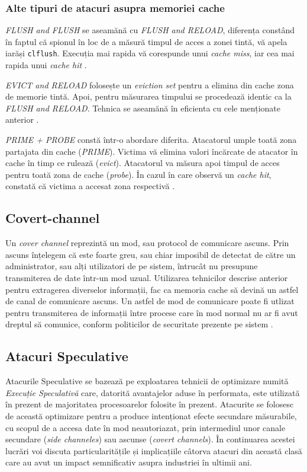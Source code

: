 \subsubsection{Alte tipuri de atacuri asupra memoriei cache}

\emph{FLUSH and FLUSH} se aseamănă cu \emph{FLUSH and RELOAD}, diferența 
constând în faptul că spionul în loc de a măsură timpul de acces a zonei
tintă, vă apela iarăși \texttt{clflush}. Execuția mai rapida vă corespunde
unui \emph{cache miss}, iar cea mai rapida unui \emph{cache hit} \cite{cache_attacks}.

\emph{EVICT and RELOAD} folosește un \emph{eviction set} pentru a elimina din
cache zona de memorie tintă. Apoi, pentru măsurarea timpului se procedează 
identic ca la \emph{FLUSH and RELOAD}. Tehnica se aseamănă în eficienta cu 
cele menționate anterior \cite{cache_attacks}.

\emph{PRIME + PROBE} constă într-o abordare diferita. Atacatorul umple toată
zona partajata din cache (\emph{PRIME}). Victima vă elimina valori încărcate
de atacator în cache în timp ce rulează (\emph{evict}). Atacatorul va măsura 
apoi timpul de acces pentru toată zona de cache (\emph{probe}). În cazul în care observă
un \emph{cache hit}, constată că victima a accesat zona respectivă \cite{cache_attacks}.

\subsection{Covert-channel}

Un \emph{cover channel} reprezintă un mod, sau protocol de comunicare ascuns.
Prin ascuns înțelegem că este foarte greu, sau chiar imposibil de detectat de
către un administrator, sau alți utilizatori de pe sistem, întrucât nu
presupune transmiterea de date într-un mod uzual. Utilizarea tehnicilor
descrise anterior pentru extragerea diverselor informații, fac ca memoria cache
să devină un astfel de canal de comunicare ascuns. Un astfel de mod de comunicare
poate fi utlizat pentru transmiterea de informații între procese care în mod normal
nu ar fi avut dreptul să comunice, conform politicilor de securitate prezente pe 
sistem \cite{covert_channel}. 

\subsection{Atacuri Speculative}

Atacurile Speculative se bazează pe exploatarea tehnicii de optimizare numită
\emph{Execuție Speculativă} care, datorită avantajelor aduse în performata,
este utilizată în prezent de majoritatea procesoarelor folosite în prezent.
Atacurite se folosesc de această optimizare pentru a produce intenționat efecte
secundare măsurabile, cu scopul de a accesa date în mod neautoriazat, prin
intermediul unor canale secundare (\emph{side channeles}) sau ascunse
(\emph{covert channels}). În continuarea acestei lucrări voi discuta
particularitățile și implicațiile câtorva atacuri din această clasă care au
avut un impact semnificativ asupra industriei în ultimii ani.

